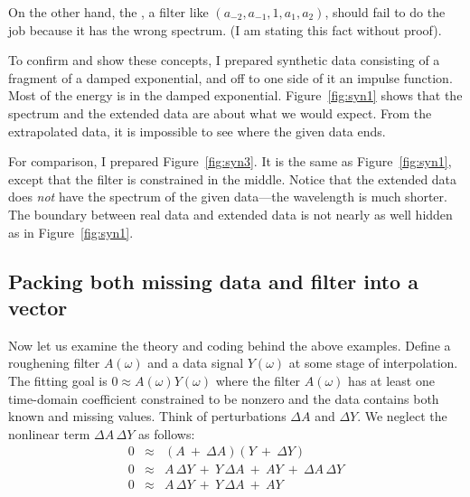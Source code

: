 \par
On the other hand,
the ,
a filter like $(a_{-2}, a_{-1}, 1, a_1, a_2)$,
should fail to do the job because it has the wrong spectrum.
(I am stating this fact without proof).

\par
To confirm and show these concepts,
I prepared synthetic data consisting of a fragment of a damped exponential,
and off to one side of it an impulse function.
Most of the energy is in the damped exponential.
Figure~\ref{fig:syn1} shows that the spectrum and the extended data
are about what we would expect.
From the extrapolated data,
it is impossible to see where the given data ends.


For comparison, I prepared
Figure~\ref{fig:syn3}.
It is the same as
Figure~\ref{fig:syn1},
except that the filter is constrained in the middle.
Notice that the extended data does {\it not} have the spectrum
of the given data---the wavelength is much shorter.
The boundary between real data and extended data
is not nearly as well hidden as in
Figure~\ref{fig:syn1}.


\subsection{Packing both missing data and filter into a vector}
Now let us examine the theory and coding behind the above examples.
Define a roughening filter $A(\omega )$ and a data signal $Y(\omega )$
at some stage of interpolation.
The fitting goal is
$0 \approx A(\omega ) Y(\omega )$
where the filter $A(\omega )$ has
at least one time-domain coefficient constrained to be nonzero
and the data contains both known and missing values.
Think of perturbations $\Delta A$ and $\Delta Y$.
We neglect the nonlinear term $\Delta A\,\Delta Y$ as follows:
\begin{eqnarray}
0 &\approx & (A \ +\ \Delta A)( Y\ +\ \Delta Y) \\
0 &\approx &
        A\,\Delta Y   \ +\ 
        Y\,\Delta A   \ +\ 
        AY
        \ +\ 
        \Delta A\, \Delta Y                             \\
        0
        &\approx & 
        A\,\Delta Y   \ +\ 
        Y\,\Delta A   \ +\ 
        AY
\label{eqn:nlreg}
\end{eqnarray}


